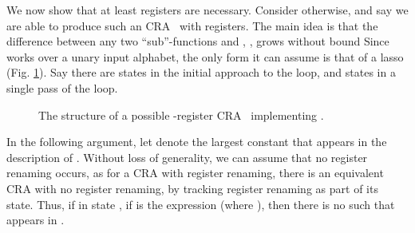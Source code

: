 \documentclass[11pt]{article}
\newcommand{\Fig}[1]{Fig. #1}
\newcommand{\EDWA}{{CRA}\xspace}
\begin{document}
We now show that at least  registers are necessary. Consider
otherwise, and say we are able to produce such an \EDWA~  with
 registers.  The main idea is that the difference between any two
{}``sub''-functions  and , , grows without bound
Since  works over a unary input
alphabet, the only form it can assume is that of a lasso (\Fig
\ref{fig:k-var-reqd:MRAA:Mkm1:Structure}). Say there are 
states in the initial approach to the loop, and  states in a
single pass of the loop.

\begin{figure}
\begin{centering}
\par\end{centering}
\caption{\label{fig:k-var-reqd:MRAA:Mkm1:Structure}The structure of a possible
-register \EDWA~  implementing .}
\end{figure}

In the following argument, let  denote the largest constant that
appears in the description of .  Without loss of generality, we can
assume that no register renaming occurs, as for a \EDWA with register
renaming, there is an equivalent \EDWA with no register renaming, by
tracking register renaming as part of its state. Thus, if in state
, if  is the expression  (where ), then there is no  such that  appears in
.
\end{document}
